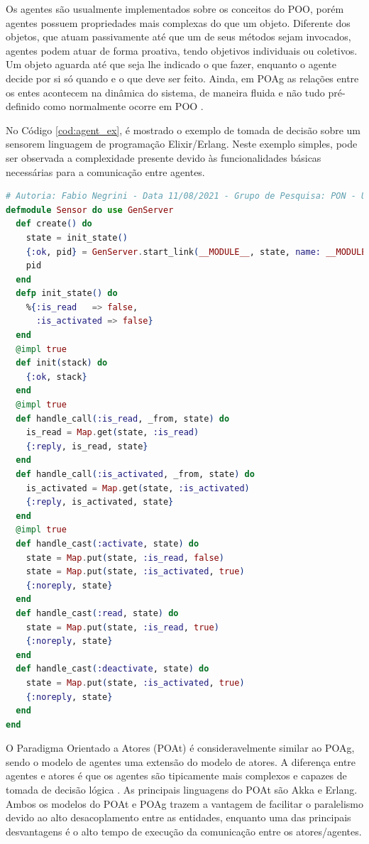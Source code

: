 Os agentes são usualmente implementados sobre os conceitos do POO, porém agentes
possuem propriedades mais complexas do que um objeto. Diferente dos objetos, que
atuam passivamente até que um de seus métodos sejam invocados, agentes podem
atuar de forma proativa, tendo objetivos individuais ou coletivos. Um objeto
aguarda até que seja lhe indicado o que fazer, enquanto o agente decide por si
só quando e o que deve ser feito. Ainda, em POAg as relações entre os entes
acontecem na dinâmica do sistema, de maneira fluida e não tudo pré-definido como
normalmente ocorre em POO \cite{msc_Banaszewski_2009}.

No Código \ref{cod:agent_ex}, é mostrado o exemplo de tomada de decisão sobre um
sensorem linguagem de programação Elixir/Erlang. Neste exemplo simples, pode ser
observada a complexidade presente devido às funcionalidades básicas necessárias
para a comunicação entre agentes.

\begin{lstlisting}[caption = {Exemplo de aplicação de sensor em Elixir no POAg}, %float=htb,
source = {Autoria própria}, language=elixir, float=htb,
  label = {cod:agent_ex}]
# Autoria: Fabio Negrini - Data 11/08/2021 - Grupo de Pesquisa: PON - UTFPR
defmodule Sensor do use GenServer
  def create() do
    state = init_state()
    {:ok, pid} = GenServer.start_link(__MODULE__, state, name: __MODULE__)
    pid
  end
  defp init_state() do
    %{:is_read   => false,
      :is_activated => false}
  end
  @impl true
  def init(stack) do
    {:ok, stack}
  end
  @impl true
  def handle_call(:is_read, _from, state) do
    is_read = Map.get(state, :is_read)
    {:reply, is_read, state}
  end
  def handle_call(:is_activated, _from, state) do
    is_activated = Map.get(state, :is_activated)
    {:reply, is_activated, state}
  end
  @impl true
  def handle_cast(:activate, state) do
    state = Map.put(state, :is_read, false)
    state = Map.put(state, :is_activated, true)
    {:noreply, state}
  end
  def handle_cast(:read, state) do
    state = Map.put(state, :is_read, true)
    {:noreply, state}
  end
  def handle_cast(:deactivate, state) do
    state = Map.put(state, :is_activated, true)
    {:noreply, state}
  end
end
\end{lstlisting}

O Paradigma Orientado a Atores (POAt) é consideravelmente similar ao POAg, sendo
o modelo de agentes uma extensão do modelo de atores. A diferença entre agentes
e atores é que os agentes são tipicamente mais complexos e capazes de tomada de
decisão lógica \cite{cardoso_2013}. As principais linguagens do POAt são Akka e
Erlang. Ambos os modelos do POAt e POAg trazem a vantagem de facilitar o
paralelismo devido ao alto desacoplamento entre as entidades, enquanto uma das
principais desvantagens é o alto tempo de execução da comunicação entre os
atores/agentes.

